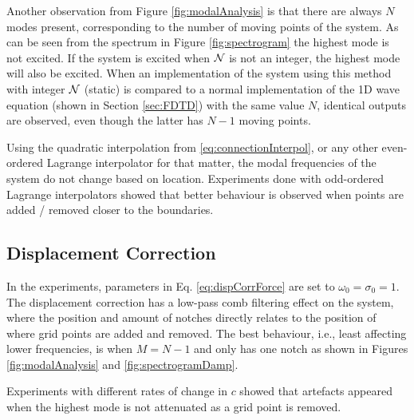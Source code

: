 Another observation from Figure \ref{fig:modalAnalysis} is that there are always $N$ modes present, corresponding to the number of moving points of the system. As can be seen from the spectrum in Figure \ref{fig:spectrogram} the highest mode is not excited. If the system is excited when $\mathcal{N}$ is not an integer, the highest mode will also be excited.
When an implementation of the system using this method with integer $\mathcal{N}$ (static) is compared to a normal implementation of the 1D wave equation (shown in Section \ref{sec:FDTD}) with the same value $N$, identical outputs are observed, even though the latter has $N-1$ moving points. \SWcomment[this confirms that \eqref{eq:totalSystem} reduces to the normal case when $\alpha = 0$]

Using the quadratic interpolation from \eqref{eq:connectionInterpol}, or any other even-ordered Lagrange interpolator for that matter, the modal frequencies of the system do not change based on location. Experiments done with odd-ordered Lagrange interpolators showed that better behaviour is observed when points are added / removed closer to the boundaries. 

\subsection{Displacement Correction}\label{sec:dispCorrRes}
In the experiments, parameters in Eq. \eqref{eq:dispCorrForce} are set to $\omega_0 = \sigma_0 = 1$. The displacement correction has a low-pass comb filtering effect on the system, where the position and amount of notches directly relates to the position of where grid points are added and removed. The best behaviour, i.e., least affecting lower frequencies, is when $M = N - 1$ and only has one notch as shown in Figures \ref{fig:modalAnalysis} and \ref{fig:spectrogramDamp}.

Experiments with different rates of change in $c$ showed that artefacts appeared when the highest mode is not attenuated as a grid point is removed.

